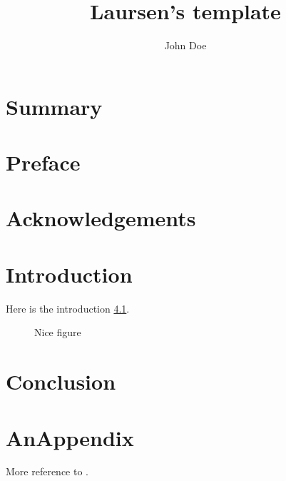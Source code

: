 \documentclass[dtucompute,twoside,10pt,extrafontsizes]{laursenthesis}
\title      {Laursen's template}
\author     {John Doe}
\theoremstyle{plain}
\theoremstyle{definition}
\begin{document}
\prefrontmatter
\maketitle
\makecolophon


\frontmatter
\chapter{Summary}
\lipsum[1]
\cite{adams1980hitchhiker}
\chapter{Preface}
\chapter{Acknowledgements}
\clearforchapter
\tableofcontents
\mylistoftodos


\mainmatter
\chapter{Introduction}
Here is the introduction \cref{myNiceFigure}.

\begin{figure}
  \caption{Nice figure}\label{myNiceFigure}
\end{figure}
\lipsum[2]

\chapter{Conclusion}
\lipsum[3]
\blinddocument 


\appendix
\chapter{AnAppendix}
More reference to \cite{rfc2549}. \lipsum[4]


\backmatter
\printbibliography[title={Bibliography}]
\end{document}
